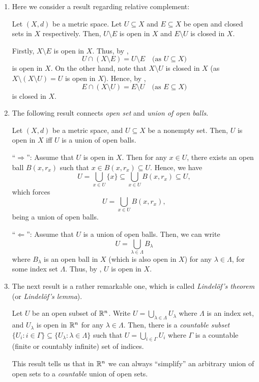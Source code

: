 \begin{enumerate}
\item Here we consider a result regarding relative complement:
\begin{proposition}
\label{prp:open-closed-comple}
Let \((X,d)\) be a metric space.  Let \(U\subseteq X\) and \(E\subseteq X\) be
open and closed sets in \(X\) respectively. Then, \(U\setminus E\) is open in
\(X\) and \(E\setminus U\) is closed in \(X\).
\end{proposition}
\begin{pf}
Firstly, \(X\setminus E\) is open in \(X\). Thus, by
,
\[
U\cap (X\setminus E)=U\setminus E\quad\text{(as \(U\subseteq X\))}
\]
is open in \(X\). On the other hand, note that \(X\setminus U\) is closed in
\(X\) (as \(X\setminus (X\setminus U)=U\) is open in \(X\)). Hence, by
,
\[
E\cap (X\setminus U)=E\setminus U\quad\text{(as \(E\subseteq X\))}
\]
is closed in \(X\).
\end{pf}
\item The following result connects \emph{open set} and \emph{union of open
balls}.
\begin{proposition}
\label{prp:open-set-union-open-balls}
Let \((X,d)\) be a metric space, and \(U\subseteq X\) be a nonempty set. Then,
\(U\) is open in \(X\) iff \(U\) is a union of open balls.
\end{proposition}
\begin{pf}
``\(\Rightarrow\)'': Assume that \(U\) is open in \(X\). Then for any \(x\in
U\), there exists an open ball \(B(x,r_x)\) such that \(x\in B(x,r_x)\subseteq
U\). Hence, we have
\[
U=\bigcup_{x\in U}\{x\}\subseteq \bigcup_{x\in U}B(x,r_x)\subseteq U,
\]
which forces 
\[
U=\bigcup_{x\in U}B(x,r_x),
\]
being a union of open balls.

``\(\Leftarrow\)'': Assume that \(U\) is a union of open balls. Then, we can
write
\[
U=\bigcup_{\lambda\in \Lambda}B_{\lambda}
\]
where \(B_{\lambda}\) is an open ball in \(X\) (which is also open in \(X\))
for any \(\lambda\in\Lambda\), for some index set \(\Lambda\). Thus, by
, \(U\) is open in \(X\).
\end{pf}

\item The next result is a rather remarkable one, which is called
\emph{Lindel\"{o}f's theorem} (or \emph{Lindel\"{o}f's lemma}).
\begin{theorem}
\label{thm:lindelof}
Let \(U\) be an open subset of \(\mathbb{R}^n\). Write
\(U=\bigcup_{\lambda\in\Lambda}U_{\lambda}\) where \(\Lambda\) is an index set,
and \(U_\lambda\) is open in \(\mathbb{R}^n\) for any \(\lambda\in\Lambda\).  Then,
there is a \emph{countable subset} \(\{U_i:i\in\Gamma\}\subseteq
\{U_{\lambda}:\lambda\in\Lambda\}\) such that \(U=\bigcup_{i\in\Gamma}U_{i}\)
where \(\Gamma\) is a countable (finite or countably infinite) set of indices.
\end{theorem}
\begin{intuition}
This result tells us that in \(\mathbb{R}^n\) we can always ``simplify'' an arbitrary
union of open sets to a \emph{countable} union of open sets.
\end{intuition}


\end{enumerate}
